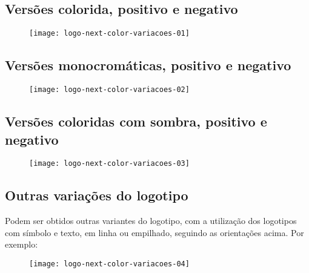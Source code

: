 \documentclass{manualmarca}
\begin{document}
\subsection{Versões colorida, positivo e negativo}

\begin{figure}[!htp]
  \centering
  \texttt{[image: logo-next-color-variacoes-01]}
\end{figure}

\subsection{Versões monocromáticas, positivo e negativo}

\begin{figure}[!htp]
  \centering
  \texttt{[image: logo-next-color-variacoes-02]}
\end{figure}

\subsection{Versões coloridas com sombra, positivo e negativo}

\begin{figure}[!htp]
  \centering
  \texttt{[image: logo-next-color-variacoes-03]}
\end{figure}

\subsection{Outras variações do logotipo}

Podem ser obtidos outras variantes do logotipo, com a utilização dos logotipos com símbolo e texto, em linha ou empilhado, seguindo as orientações acima. Por exemplo:

\begin{figure}[!htp]
  \centering
  \texttt{[image: logo-next-color-variacoes-04]}
\end{figure}


\pagebreak[4]



\end{document}
